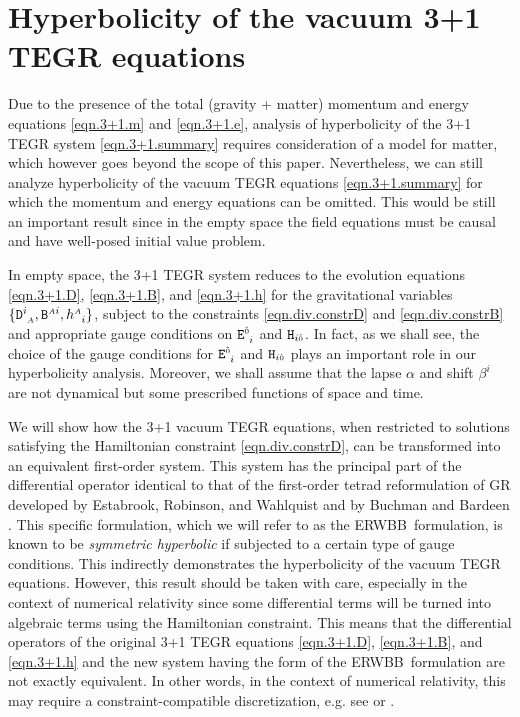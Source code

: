 \documentclass[
10pt, %
a4paper, %
oneside, %
twocolumn,
headinclude,footinclude, %
BCOR5mm, %
]{scrartcl}
\newcommand{\ERWBB}{{ERWBB}}
\newcommand{\sA}{\mathsmaller A}
\newcommand{\tetrsymbol}{h}
\newcommand{\tetr}[2]{\tetrsymbol^{#1}_{\phantom{#1}#2}}
\newcommand{\Dfin}[2]{\mathtt{D}_{\phantom{#2}#1}^{#2}}	%
\newcommand{\Hfin}[2]{\mathtt{H}_{#2#1}}	%
\newcommand{\Efin}[2]{\mathtt{E}^{#1}_{\phantom{#1}#2}}	%
\newcommand{\Bfin}[2]{\mathtt{B}^{#1#2}}	%
\newcommand{\indalg}[1]{\hat{\mathsmaller{#1}}}
\newcommand{\lapse}{\alpha}
\newcommand{\shift}[1]{\beta^{#1}}
\begin{document}
	
	\section{Hyperbolicity of the vacuum 3+1 TEGR equations}\label{sec.hyperbolicity}

	Due to the presence of the total (gravity + matter) momentum and energy
	equations \eqref{eqn.3+1.m} and \eqref{eqn.3+1.e}, analysis of hyperbolicity
	of the 3+1 TEGR system \eqref{eqn.3+1.summary} requires consideration of a
	model for matter, which however goes beyond the scope of this paper.
	Nevertheless, we can still analyze hyperbolicity of the vacuum TEGR
	equations \eqref{eqn.3+1.summary} for which the momentum and energy
	equations can be omitted. This would be still an important result since in
	the empty space the field equations must be causal and have well-posed
	initial value problem. 
	
	In empty space, the 3+1 TEGR system reduces to the evolution equations
	\eqref{eqn.3+1.D}, \eqref{eqn.3+1.B}, and \eqref{eqn.3+1.h} for the
	gravitational variables $\{\Dfin{\sA}{i},\Bfin{\sA}{i},\tetr{\sA}{i}\}$,
	subject to the constraints \eqref{eqn.div.constrD} and
	\eqref{eqn.div.constrB} and appropriate gauge conditions on
	$\Efin{\indalg{0}}{i}$ and $\Hfin{\indalg{0}}{i}$. In fact, as we shall see,
	the choice of the gauge conditions for $\Efin{\indalg{0}}{i}$ and
	$\Hfin{\indalg{0}}{i}$ plays an important role in our hyperbolicity
	analysis. Moreover, we shall assume that the lapse $\lapse$ and shift
	$\shift{i}$ are not dynamical but some prescribed functions of space and
	time.

	We will show how the 3+1 vacuum TEGR equations, when restricted to solutions
	satisfying the Hamiltonian constraint \eqref{eqn.div.constrD}, can be
	transformed into an equivalent first-order system. This system has the
	principal part of the differential operator identical to that of the
	first-order tetrad reformulation of GR developed by Estabrook, Robinson, and
	Wahlquist \cite{Estabrook1997} and by Buchman and Bardeen
	\cite{Estabrook1997}. This specific formulation, which we will refer to as
	the \ERWBB\ formulation, is known to be \textit{symmetric hyperbolic} if
	subjected to a certain type of gauge conditions. This indirectly
	demonstrates the hyperbolicity of the vacuum TEGR equations. However, this
	result should be taken with care, especially in the context of numerical
	relativity since some differential terms will be turned into algebraic terms
	using the Hamiltonian constraint. This means that the differential operators
	of the original 3+1 TEGR equations \eqref{eqn.3+1.D}, \eqref{eqn.3+1.B}, and
	\eqref{eqn.3+1.h} and the new system having the form of the \ERWBB\
	formulation are not exactly equivalent. In other words, in the context of
	numerical relativity, this may require a constraint-compatible
	discretization, e.g. see \cite[Sec.VI.G]{Olivares2022} or
	\cite{oliynyk2025}.
\end{document}
